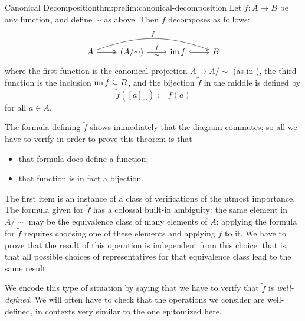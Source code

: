 \begin{thm}{Canonical Decomposition}{thm:prelim:canonical-decomposition}
  Let $f : A \to B$ be any function, and define $\sim$ as above. Then
  $f$ decomposes as follows:
  \[
    \begin{tikzcd}
      A \arrow[r, two heads] \arrow[rrr, bend left=20, "f"] &
      (A/{\sim}) \arrow[r, "\tilde{f}", "\sim"'] & \image f \arrow[r,
      hook] & B
    \end{tikzcd}
  \]
  where the first function is the canonical projection
  $A \to A/{\sim}$ (as in
  ), the third function is
  the inclusion $\operatorname{im} f \subseteq B$, and the bijection $\tilde{f}$
  in the middle is defined by
  \[ \tilde{f}({[a]}_\sim) := f(a) \] for all $a \in A$.
\end{thm}

The formula defining $\tilde{f}$ shows immediately that the diagram
commutes; so all we have to verify in order to prove this theorem is
that
\begin{itemize}
\item that formula does define a function;
\item that function is in fact a bijection.
\end{itemize}
The first item is an instance of a class of verifications of the
utmost importance. The formula given for $\tilde{f}$ has a colossal
built-in ambiguity: the same element in $A/{\sim}$ may be the
equivalence class of many elements of $A$; applying the formula for
$\tilde{f}$ requires choosing one of these elements and applying $f$
to it. We have to prove that the result of this operation is
independent from this choice: that is, that all possible choices of
representatives for that equivalence class lead to the same result.

We encode this type of situation by saying that we have to verify that
$\tilde{f}$ is \emph{well-defined}. We will often have to check that
the operations we consider are well-defined, in contexts very similar
to the one epitomized here.

